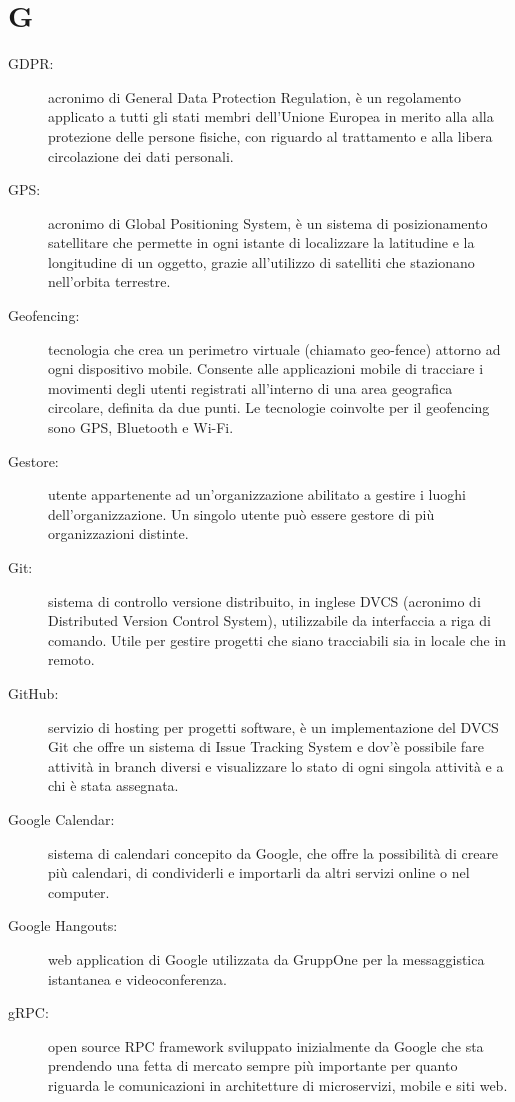 \documentclass{article}
\begin{document}
\section{G}
\begin{description}
  \item[GDPR:] acronimo di General Data Protection Regulation, è un regolamento applicato a tutti gli stati membri dell'Unione Europea in merito alla alla protezione delle persone fisiche, con riguardo al trattamento e alla libera circolazione dei dati personali.
  \item[GPS:] acronimo di Global Positioning System, è un sistema di posizionamento satellitare che permette in ogni istante di localizzare la latitudine e la longitudine di un oggetto, grazie all'utilizzo di satelliti che stazionano nell'orbita terrestre.
  \item[Geofencing:] tecnologia che crea un perimetro virtuale (chiamato geo-fence) attorno ad ogni dispositivo mobile. Consente alle applicazioni mobile di tracciare i movimenti degli utenti registrati all’interno di una area geografica circolare, definita da due punti. Le tecnologie coinvolte per il geofencing sono GPS, Bluetooth e Wi-Fi.
  \item[Gestore:] utente appartenente ad un'organizzazione abilitato a gestire i luoghi dell'organizzazione. Un singolo utente può essere gestore di più organizzazioni distinte.
  \item[Git:] sistema di controllo versione distribuito, in inglese DVCS (acronimo di Distributed Version Control System), utilizzabile da interfaccia a riga di comando. Utile per gestire progetti che siano tracciabili sia in locale che in remoto.
  \item[GitHub:] servizio di hosting per progetti software, è un implementazione del DVCS Git che offre un sistema di Issue Tracking System e dov'è possibile fare attività in branch diversi e visualizzare lo stato di ogni singola attività e a chi è stata assegnata.
  \item[Google Calendar:] sistema di calendari concepito da Google, che offre la possibilità di creare più calendari, di condividerli e importarli da altri servizi online o nel computer.
  \item[Google Hangouts:] web application di Google utilizzata da GruppOne per la messaggistica istantanea e videoconferenza.
  \item[gRPC:] open source RPC framework sviluppato inizialmente da Google che sta prendendo una fetta di mercato sempre più importante per quanto riguarda le comunicazioni in architetture di microservizi, mobile e siti web.
\end{description}
\newpage
\end{document}
